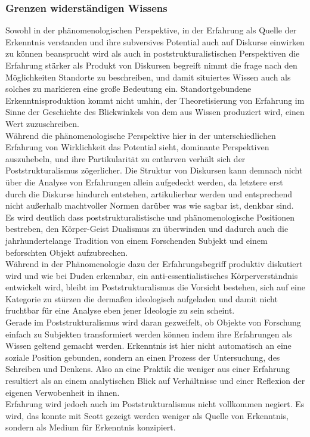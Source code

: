 \subsubsection{Grenzen widerständigen Wissens}

Sowohl in der phänomenologischen Perspektive, in der Erfahrung als Quelle der
Erkenntnis verstanden und ihre subversives Potential auch auf Diskurse
einwirken zu können beansprucht wird\footnotemark {} als auch in poststrukturalistischen
Perspektiven die Erfahrung stärker als Produkt von Diskursen begreift\footnotemark {} nimmt
die frage nach den Möglichkeiten Standorte zu beschreiben, und damit situiertes
Wissen auch als solches zu markieren eine große Bedeutung ein.
Standortgebundene Erkenntnisproduktion kommt nicht umhin, der Theoretisierung
von Erfahrung im Sinne der Geschichte des Blickwinkels von dem aus Wissen
produziert wird, einen Wert zuzuschreiben.\\
Während die phänomenologische
Perspektive hier in der unterschiedlichen Erfahrung von Wirklichkeit das
Potential sieht, dominante Perspektiven auszuhebeln, und ihre Partikularität
zu entlarven verhält sich der Poststrukturalismus zögerlicher. Die Struktur von
Diskursen kann demnach nicht über die Analyse von Erfahrungen allein aufgedeckt
werden, da letztere erst durch die Diskurse hindurch entstehen, artikulierbar
werden und entsprechend nicht außerhalb machtvoller Normen darüber was wie
sagbar ist, denkbar sind.\\

\noindent Es wird deutlich dass poststrukturalistische und phänomenologische Positionen
bestreben, den Körper-Geist Dualismus zu überwinden und dadurch auch die
jahrhundertelange Tradition von einem Forschenden Subjekt und einem beforschten
Objekt aufzubrechen. \\
Während in der Phänomenologie dazu der Erfahrungsbegriff
produktiv diskutiert wird und wie bei Duden erkennbar, ein
anti-essentialistisches Körperverständnis entwickelt wird, bleibt im
Poststrukturalismus die Vorsicht bestehen, sich auf eine Kategorie zu stürzen
die dermaßen ideologisch aufgeladen und damit nicht fruchtbar für eine Analyse
eben jener Ideologie zu sein scheint. \\
Gerade im Poststrukturalismus wird daran
gezweifelt, ob Objekte von Forschung einfach zu Subjekten transformiert werden
können indem ihre Erfahrungen als Wissen geltend gemacht werden. Erkenntnis ist
hier nicht automatisch an eine soziale Position gebunden, sondern an einen
Prozess der Untersuchung, des Schreiben und Denkens. Also an eine Praktik die
weniger aus einer Erfahrung resultiert als an einem analytischen Blick auf
Verhältnisse und einer Reflexion der eigenen Verwobenheit in ihnen. \\
Erfahrung
wird jedoch auch im Poststrukturalismus nicht vollkommen negiert. Es wird, das
konnte mit Scott gezeigt werden weniger als Quelle von Erkenntnis, sondern als
Medium für Erkenntnis konzipiert.\\

